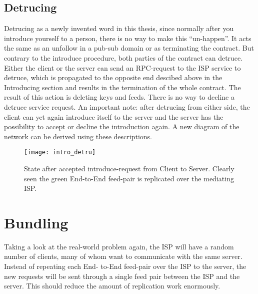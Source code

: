 \subsection{Detrucing}
Detrucing as a newly invented word in this thesis, since normally after you introduce yourself to a person, there is no way to make this “un-happen”. It acts the same as an unfollow in a pub-sub domain or as terminating the contract. But contrary to the introduce procedure, both parties of the contract can detruce.
Either the client or the server can send an RPC-request to the ISP service to detruce, which is propagated to the opposite end descibed above in the Introducing section and results in the termination of the whole contract. The result of this action is deleting keys and feeds. There is no way to decline a detruce service request. An important note: after detrucing from either side, the client can yet again introduce itself to the server and the server has the possibility to accept or decline the introduction again.
A new diagram of the network can be derived using these descriptions.
\begin{figure}
    \centering
    \texttt{[image: intro\_detru]}
    \caption{State after accepted introduce-request from Client to Server. Clearly seen the green End-to-End feed-pair is replicated over the mediating ISP.}
    \label{fig:contract_cli_isp}
\end{figure}

\pagebreak

\section{Bundling}
Taking a look at the real-world problem again, the ISP will have a random number of clients,
many of whom want to communicate with the same server. Instead of repeating each End-
to-End feed-pair over the ISP to the server, the new requests will be sent through a single
feed pair between the ISP and the server. This should reduce the amount of replication
work enormously.

